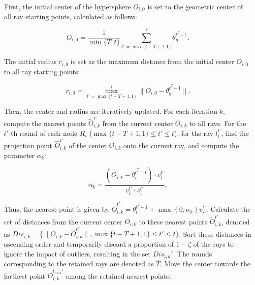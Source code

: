 \documentclass[lettersize,journal]{IEEEtran}
\begin{document}
First, the initial center of the hypersphere \( O_{i,0} \) is set to the geometric center of all ray starting points, calculated as follows:

\begin{equation}
    O_{i,0} = \frac{1}{\min\{T, t\}} \sum_{t'=\max\{t-T+1, 1\}}^{t} \widetilde{\theta_g^{t'-1}}.
\end{equation}

The initial radius \( r_{i,0} \) is set as the maximum distance from the initial center \( O_{i,0} \) to all ray starting points:

\begin{equation}
r_{i,0} = \max_{t'=\max\{t-T+1, 1\}}^{t}  \|O_{i,0} - \widetilde{\theta_{g}^{t'-1}}\|.
\end{equation}

Then, the center and radius are iteratively updated. 
For each iteration \( k \), compute the nearest points \( \tilde{O}_{i,k}^{t'} \) from the current center \( O_{i,k} \) to all rays. For the $t'$-th round of each node $R_i$ (\(\max\{t-T+1, 1\}\leq  t'\leq t\)), for the ray \( l_i^{t'} \), find the projection point \( \hat O_{i,k}^{t'} \) of the center \( O_{i,k} \) onto the current ray, and compute the parameter \( \alpha_k \):

\begin{equation}
\alpha_k = \frac{(O_{i,k} - \widetilde{\theta_{i}^{t'-1}}) \cdot {v}_{i}^{t'}}{{v}_{i}^{t'}\cdot {v}_{i}^{t'}},
\end{equation}

Thus, the nearest point is given by \( \tilde O_{i,k}^{t'} =\widetilde{\theta_{i}^{t'-1}}+\max \left\{ 0, \alpha_k\right\} {v}_{i}^{t'} \). 
Calculate the set of distances from the current center \( O_{i,k} \) to these nearest points \( \tilde O_{i,k}^{t'} \), denoted as \( Dis_{i,k}= \{ \| O_{i,k}-\tilde O_{i,k}^{t'} \|, \max\{t-T+1, 1\}\leq  t'\leq t\} \). Sort these distances in ascending order and temporarily discard a proportion of \(1-\zeta\) of the rays to ignore the impact of outliers, resulting in the set ${Dis}_{i,k}'$. The rounds corresponding to the retained rays are denoted as $\tilde T$. Move the center towards the farthest point $\tilde{O}_{i,k}^{t_{max}'}$ among the retained nearest points:
\end{document}

